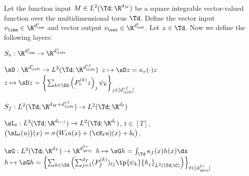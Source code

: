 \documentclass[letterpaper,11pt]{article}
\begin{document}
\begin{definition} \label{def:FNM}
    Let the function input $M \in L^2(\Td; \R^{d_M})$ be a square integrable vector-valued function over the multidimensional torus $\Td$. Define the vector input $v_{\inn} \in \R^{d_{\inn}^v}$ and vector output $v_{\out} \in \R^{d_{\out}^v}$. Let $x\in \Td$. Now we define the following layers: 
    \begin{itemize}[topsep=1.67ex,itemsep=0.5ex,partopsep=1ex,parsep=1ex,leftmargin=35ex]
         $S_v: \R^{d_{\inn}^v} \to \R^{d_{\lift}^v}$
        
         $\sD: \R^{d_{\lift}^v} \to L^2(\Td; \R^{d_{\lift}^{vf}})$ \newline 
        $z \mapsto \sD z = \kappa_v(\cdot)z$ \newline
        $z \mapsto \sD z = \left\{\sum_{k \in \Zd} \left(P_v^{(k)}z\right)_j \psi_k\right\}_{j \in [d_{\lift}^{vf}]}$

         $S_f: L^2(\Td; \R^{d_M + d_{\lift}^{vf}}) \to L^2(\Td; \R^{d_0})$

         $\sL_t: L^2(\Td; \R^{d_{t-1}}) \to L^2(\Td;\R^{d_t})$, $t \in [T]$, \newline $\bigl(\sL_t(u)\bigr)(x) = \sigma\bigl(W_t u(x) + (\cK_t u)(x) + b_t\bigr)$, 

         $\sG: L^2(\Td;\R^{d_T}) \to \R^{d_{\proj}^{fv}}$ \newline
        $h \mapsto \sG h = \int_{\Td} \kappa_f(x) h(x) \dx$ \newline
        $h \mapsto \sG h = \left\{\sum_{k \in \Zd}\left(\sum_{j=1}^{d_T} (P^{(k)}_f)_{\ell j} \ip{\psi_k}{h_j}_{L^2(\Td;\C)}\right)\right\}_{\ell \in [d_{\proj}^{fv}]}$


\end{itemize}
\end{definition}
\end{document}
